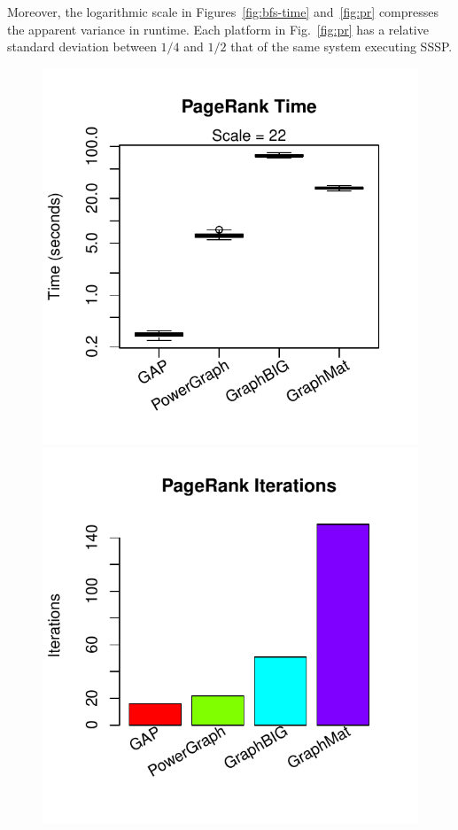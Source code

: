 \documentclass[conference]{IEEEtran}
\begin{document}
Moreover, the logarithmic scale in Figures~\ref{fig:bfs-time} and~\ref{fig:pr} compresses the apparent variance in runtime. Each platform in Fig.~\ref{fig:pr} has a relative standard deviation between $1/4$ and $1/2$ that of the same system executing SSSP.

\begin{figure}
	\centering
	\begin{minipage}{0.48\linewidth}
		\includegraphics[width=\linewidth, trim=0pt 18pt 18pt 0pt, clip]{graphics/pr_time.pdf}
	\end{minipage}
	\begin{minipage}{0.48\linewidth}
		\includegraphics[width=\linewidth, trim=0 18pt 18pt 0pt, clip]{graphics/pr_iters.pdf}

\end{minipage}
\end{figure}
\end{document}

